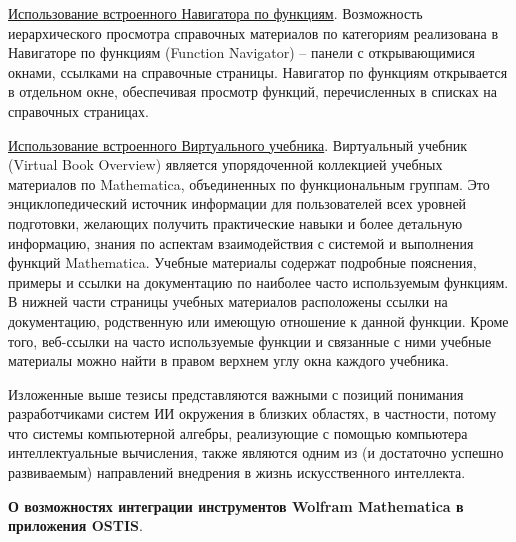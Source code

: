 \underline{Использование встроенного Навигатора по функциям}. Возможность иерархического просмотра справочных материалов по категориям реализована в Навигаторе по функциям (Function Navigator) -- панели с открывающимися окнами, ссылками на справочные страницы. Навигатор по функциям открывается в отдельном окне, обеспечивая просмотр функций, перечисленных в списках на справочных страницах.

\underline{Использование встроенного Виртуального учебника}. 
Виртуальный учебник (Virtual Book Overview) является упорядоченной коллекцией учебных материалов по Mathematica, объединенных по функциональным группам. Это энциклопедический источник информации для пользователей всех уровней подготовки, желающих получить практические навыки и более детальную информацию, знания по аспектам взаимодействия с системой и выполнения функций Mathematica.
Учебные материалы содержат подробные пояснения, примеры и ссылки на документацию по наиболее часто используемым функциям. В нижней части страницы учебных материалов расположены ссылки на документацию, родственную или имеющую отношение к данной функции. Кроме того, веб-ссылки на часто используемые функции и связанные с ними учебные материалы можно найти в правом верхнем углу окна каждого учебника.

Изложенные выше тезисы представляются важными с позиций понимания разработчиками систем ИИ окружения в близких областях, в частности, потому что системы компьютерной алгебры, реализующие с помощью компьютера интеллектуальные вычисления, также являются одним из (и достаточно успешно развиваемым) направлений внедрения в жизнь искусственного интеллекта.

\textbf{О возможностях интеграции инструментов Wolfram Mathematica в приложения OSTIS}.

